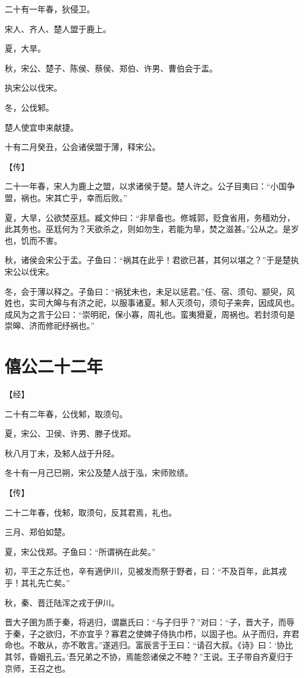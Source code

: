 \documentclass[a4paper,12pt,UTF8,twoside]{ctexbook}
\begin{document}
二十有一年春，狄侵卫。

宋人、齐人、楚人盟于鹿上。

夏，大旱。

秋，宋公、楚子、陈侯、蔡侯、郑伯、许男、曹伯会于盂。

执宋公以伐宋。

冬，公伐邾。

楚人使宜申来献捷。

十有二月癸丑，公会诸侯盟于薄，释宋公。

【传】

二十一年春，宋人为鹿上之盟，以求诸侯于楚。楚人许之。公子目夷曰：“小国争盟，祸也。宋其亡乎，幸而后败。”

夏，大旱，公欲焚巫尪。臧文仲曰：“非旱备也。修城郭，贬食省用，务穑劝分，此其务也。巫尪何为？天欲杀之，则如勿生，若能为旱，焚之滋甚。”公从之。是岁也，饥而不害。

秋，诸侯会宋公于盂。子鱼曰：“祸其在此乎！君欲已甚，其何以堪之？”于是楚执宋公以伐宋。

冬，会于薄以释之。子鱼曰：“祸犹未也，未足以惩君。”任、宿、须句、颛臾，风姓也，实司大皞与有济之祀，以服事诸夏。邾人灭须句，须句子来奔，因成风也。成风为之言于公曰：“崇明祀，保小寡，周礼也。蛮夷猾夏，周祸也。若封须句是崇皞、济而修祀纾祸也。”

\section{僖公二十二年}



【经】

二十有二年春，公伐邾，取须句。

夏，宋公、卫侯、许男、滕子伐郑。

秋八月丁未，及邾人战于升陉。

冬十有一月己巳朔，宋公及楚人战于泓，宋师败绩。

【传】

二十二年春，伐邾，取须句，反其君焉，礼也。

三月、郑伯如楚。



夏，宋公伐郑。子鱼曰：“所谓祸在此矣。”

初，平王之东迁也，辛有適伊川，见被发而祭于野者，曰：“不及百年，此其戎乎！其礼先亡矣。”

秋，秦、晋迁陆浑之戎于伊川。

晋大子圉为质于秦，将逃归，谓嬴氏曰：“与子归乎？”对曰：“子，晋大子，而辱于秦，子之欲归，不亦宜乎？寡君之使婢子侍执巾栉，以固子也。从子而归，弃君命也。不敢从，亦不敢言。”遂逃归。富辰言于王曰：“请召大叔。《诗》曰：‘协比其邻，昏姻孔云。’吾兄弟之不协，焉能怨诸侯之不睦？”王说。王子带自齐夏归于京师，王召之也。
\end{document}
